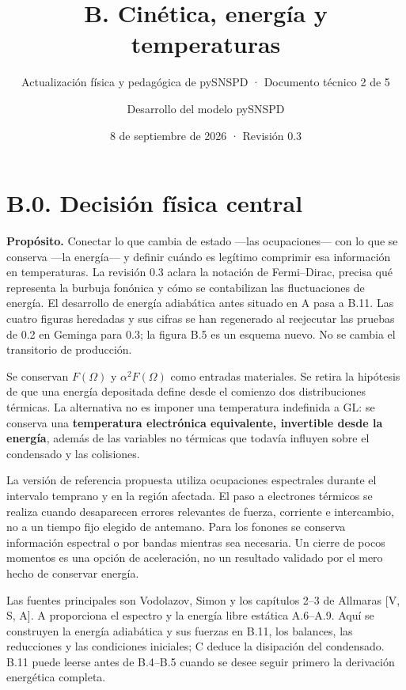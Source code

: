\documentclass[
  spanish,
  10pt,
  a4paper,
]{article}
\title{B. Cinética, energía y temperaturas}
\subtitle{Actualización física y pedagógica de pySNSPD · Documento
técnico 2 de 5}
\author{Desarrollo del modelo pySNSPD}
\date{8 de septiembre de 2026 · Revisión 0.3}
\newcounter{none} %
\begin{document}
\maketitle

{
\setcounter{tocdepth}{2}
\tableofcontents
}
\newpage

\section{B.0. Decisión física
central}\label{b.0.-decisiuxf3n-fuxedsica-central}

\textbf{Propósito.} Conectar lo que cambia de estado ---las
ocupaciones--- con lo que se conserva ---la energía--- y definir cuándo
es legítimo comprimir esa información en temperaturas. La revisión 0.3
aclara la notación de Fermi--Dirac, precisa qué representa la burbuja
fonónica y cómo se contabilizan las fluctuaciones de energía. El
desarrollo de energía adiabática antes situado en A pasa a B.11. Las
cuatro figuras heredadas y sus cifras se han regenerado al reejecutar
las pruebas de 0.2 en Geminga para 0.3; la figura B.5 es un esquema
nuevo. No se cambia el transitorio de producción.

Se conservan \(F(\Omega)\) y \(\alpha^2F(\Omega)\) como entradas
materiales. Se retira la hipótesis de que una energía depositada define
desde el comienzo dos distribuciones térmicas. La alternativa no es
imponer una temperatura indefinida a GL: se conserva una
\textbf{temperatura electrónica equivalente, invertible desde la
energía}, además de las variables no térmicas que todavía influyen sobre
el condensado y las colisiones.

La versión de referencia propuesta utiliza ocupaciones espectrales
durante el intervalo temprano y en la región afectada. El paso a
electrones térmicos se realiza cuando desaparecen errores relevantes de
fuerza, corriente e intercambio, no a un tiempo fijo elegido de
antemano. Para los fonones se conserva información espectral o por
bandas mientras sea necesaria. Un cierre de pocos momentos es una opción
de aceleración, no un resultado validado por el mero hecho de conservar
energía.

Las fuentes principales son Vodolazov, Simon y los capítulos 2--3 de
Allmaras {[}V, S, A{]}. A proporciona el espectro y la energía libre
estática A.6--A.9. Aquí se construyen la energía adiabática y sus
fuerzas en B.11, los balances, las reducciones y las condiciones
iniciales; C deduce la disipación del condensado. B.11 puede leerse
antes de B.4--B.5 cuando se desee seguir primero la derivación
energética completa.
\end{document}
